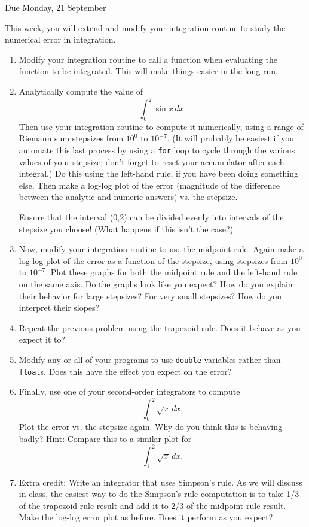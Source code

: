 \documentclass[12pt]{article}
\begin{document}
\Large
\centerline{}
\centerline{Due Monday, 21 September}
\normalsize

This week, you will extend and modify your integration routine to study the numerical error in integration.
\begin{enumerate}

\item{Modify your integration routine to call a function when evaluating the function to be integrated. This will make things easier in the long run.}

\item{Analytically compute the value of $$\int_{0}^{2} \sin x\, dx.$$ Then use your integration routine to compute it numerically, using a range of Riemann sum stepsizes from $10^{0}$
    to $10^{-7}$. (It will probably be easiest if you automate this last process by using a {\tt for} loop to cycle through the various values of your stepsize; don't forget to reset your
  accumulator after each integral.) Do this using the left-hand rule, if you have been doing something else. 
  Then make a log-log plot of the error (magnitude of the difference between the analytic and numeric answers) vs. the stepsize.

Ensure that the interval (0,2) can be divided evenly into intervals of the stepsize you choose! (What happens if this isn't the case?)}

\item{Now, modify your integration routine to use the midpoint rule. Again make a log-log plot of the error as a function of the stepsize, using stepsizes from $10^{0}$ to $10^{-7}$.
    Plot these graphs for both the midpoint rule and the left-hand rule on the same axis. Do the graphs look like you expect? How do you explain their behavior for large stepsizes?
  For very small stepsizes? How do you interpret their slopes?}

\item{Repeat the previous problem using the trapezoid rule. Does it behave as you expect it to?}

\item{Modify any or all of your programs to use {\tt double} variables rather than {\tt float}s. Does this have the effect you expect on the error?}

\item{Finally, use one of your second-order integrators to compute $$\int_0^2 \sqrt{x}\,dx.$$ Plot the error vs. the stepsize again. Why do you think this is behaving badly?
  Hint: Compare this to a similar plot for $$\int_1^2 \sqrt{x}\,dx.$$}

\item{Extra credit: Write an integrator that uses Simpson's rule. As we will discuss in class, the easiest way to do the Simpson's rule computation is to take 1/3 of the trapezoid
  rule result and add it to 2/3 of the midpoint rule result. Make the log-log error plot as before. Does it perform as you expect?}
  \end{enumerate} 
\end{document}
